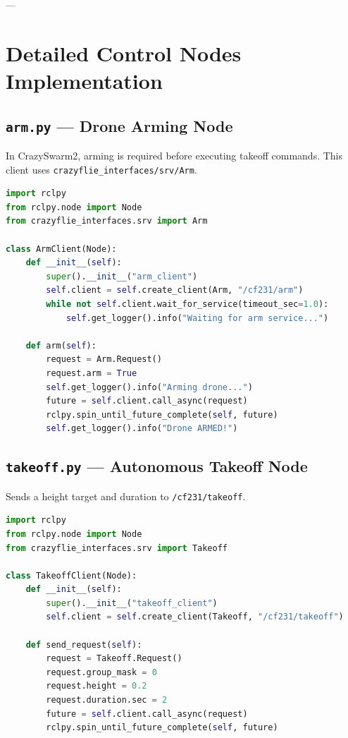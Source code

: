 \documentclass[11pt,a4paper]{article}
\begin{document}
---

\section{Detailed Control Nodes Implementation}

\subsection{\texttt{arm.py} — Drone Arming Node}
In CrazySwarm2, arming is required before executing takeoff commands. This client uses \texttt{crazyflie\_interfaces/srv/Arm}.

\begin{lstlisting}[language=python]
import rclpy
from rclpy.node import Node
from crazyflie_interfaces.srv import Arm

class ArmClient(Node):
    def __init__(self):
        super().__init__("arm_client")
        self.client = self.create_client(Arm, "/cf231/arm")
        while not self.client.wait_for_service(timeout_sec=1.0):
            self.get_logger().info("Waiting for arm service...")

    def arm(self):
        request = Arm.Request()
        request.arm = True
        self.get_logger().info("Arming drone...")
        future = self.client.call_async(request)
        rclpy.spin_until_future_complete(self, future)
        self.get_logger().info("Drone ARMED!")
\end{lstlisting}

\subsection{\texttt{takeoff.py} — Autonomous Takeoff Node}
Sends a height target and duration to \texttt{/cf231/takeoff}.

\begin{lstlisting}[language=python]
import rclpy
from rclpy.node import Node
from crazyflie_interfaces.srv import Takeoff

class TakeoffClient(Node):
    def __init__(self):
        super().__init__("takeoff_client")
        self.client = self.create_client(Takeoff, "/cf231/takeoff")

    def send_request(self):
        request = Takeoff.Request()
        request.group_mask = 0
        request.height = 0.2
        request.duration.sec = 2
        future = self.client.call_async(request)
        rclpy.spin_until_future_complete(self, future)
\end{lstlisting}
\end{document}
